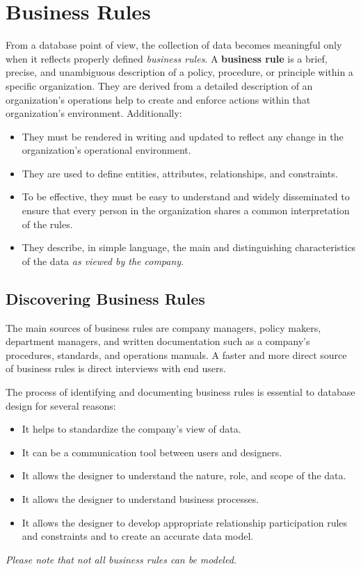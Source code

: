 \documentclass[a4paper, 12pt, titlepage]{report}
\begin{document}
\section{Business Rules}
From a database point of view, the collection of data becomes meaningful only when it reflects properly defined \emph{business rules}. A \textbf{business rule} is a brief, precise, and unambiguous description of a policy, procedure, or principle within a specific organization. They are derived from a detailed description of an organization’s operations help to create and enforce actions within that organization’s environment. Additionally:
\begin{itemize}
\item They must be rendered in writing and updated to reflect any change in the organization’s operational environment.
\item They are used to define entities, attributes, relationships, and constraints. 
\item To be effective, they must be easy to understand and widely disseminated to ensure that every person in the organization shares a common interpretation of the rules.
\item They describe, in simple language, the main and distinguishing characteristics of the data \emph{as viewed by the company}.
\end{itemize}
\subsection{Discovering Business Rules}
The main sources of business rules are company managers, policy makers, department managers, and written documentation such as a company’s procedures, standards, and operations manuals. A faster and more direct source of business rules is direct interviews with end users.

The process of identifying and documenting business rules is essential to database design for several reasons:
\begin{itemize}
\item It helps to standardize the company’s view of data.
\item It can be a communication tool between users and designers.
\item It allows the designer to understand the nature, role, and scope of the data.
\item It allows the designer to understand business processes.
\item It allows the designer to develop appropriate relationship participation rules and constraints and to create an accurate data model.
\end{itemize}
\begin{center}
\emph{Please note that not all business rules can be modeled.}
\end{center}
\end{document}
